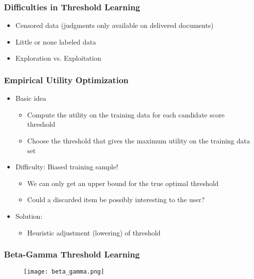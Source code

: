 \subsubsection{Difficulties in Threshold Learning}
\begin{itemize}
\item Censored data (judgments only available on delivered documents)
\item Little or none labeled data
\item Exploration vs. Exploitation
\end{itemize}


\subsubsection{Empirical Utility Optimization}
\begin{itemize}
\item Basic idea
\begin{itemize}
\item Compute the utility on the training data for each candidate score
threshold
\item Choose the threshold that gives the maximum utility on the training data set
\end{itemize}

\item Difficulty: Biased training sample!
\begin{itemize}
\item We can only get an upper bound for the true optimal threshold 
\item Could a discarded item be possibly interesting to the user?
\end{itemize}

\item Solution:
\begin{itemize}
\item Heuristic adjustment (lowering) of threshold
\end{itemize}
\end{itemize}


\subsubsection{Beta-Gamma Threshold Learning}

\begin{figure}[H]
    \centering
    \texttt{[image: beta\_gamma.png]}
\end{figure}

